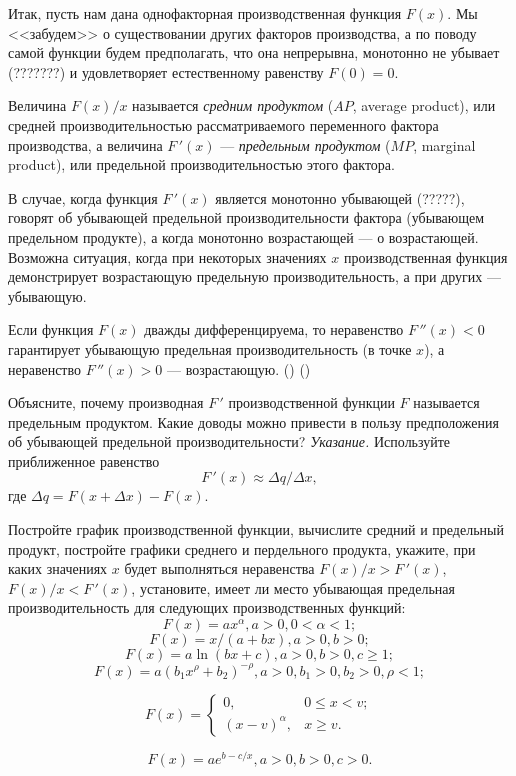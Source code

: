     Итак, пусть нам дана однофакторная производственная функция
    $F(x)$.
    Мы <<забудем>> о существовании других факторов производства, а по
    поводу самой функции будем предполагать, что она непрерывна,
    монотонно не убывает (???????) и удовлетворяет естественному равенству
    $F(0)=0$.

    Величина $F(x)/x$
    называется \emph{средним продуктом}  ($AP$, average product), или
    средней производительностью
    рассматриваемого переменного фактора производства, а  величина
    $F\,'(x)$
    --- \emph{предельным продуктом} ($MP$, marginal product), или
    предельной производительностью этого фактора.

    В случае, когда функция $F\,'(x)$ является монотонно убывающей (?????),
    говорят об убывающей предельной производительности фактора
    (убывающем предельном продукте), а когда монотонно
    возрастающей --- о возрастающей. Возможна ситуация, когда при
    некоторых значениях $x$ производственная функция демонстрирует
    возрастающую предельную производительность, а при других ---
    убывающую.

     Если функция $F(x)$ дважды
    дифференцируема, то неравенство $F\,''(x)<0$ гарантирует убывающую
    предельная производительность (в точке $x$), а неравенство $F\,''(x)>0$
    --- возрастающую.
    () ()

\begin{exer}
    Объясните, почему производная $F\,'$ производственной функции $F$
    называется предельным продуктом. Какие доводы можно привести в пользу
    предположения об убывающей предельной производительности?
    \emph{Указание.} Используйте приближенное равенство
    \[F\,'(x)\approx\Delta q/\Delta x,\]
    где  $\Delta q=F(x+\Delta x)-F(x)$.
\end{exer}

\begin{exer}
    Постройте график производственной функции, вычислите средний и
    предельный продукт, постройте графики среднего и пердельного
    продукта, укажите, при каких значениях $x$ будет выполняться неравенства
    $F(x)/x>F\,'(x)$,
     $F(x)/x<F\,'(x)$, установите, имеет ли место убывающая предельная
     производительность для следующих производственных функций:
    \[F(x)=ax^{\alpha} , a>0, 0<\alpha<1;\]
    \[F(x)=x/(a+bx), a>0, b>0;\]
    \[F(x)=a\ln(bx+c), a>0, b>0, c\geqslant1;\]
    \[F(x)=a(b_{1}x^{\rho}+b_{2})^{-\rho}, a>0, b_{1}>0, b_{2}>0,  \rho<1;\]

    \[F(x)=\left\{
      \begin{array}{ll}
        0, & 0\leqslant x<v; \\
        (x-v)^{\alpha}, & x\geqslant v.
      \end{array}
    \right.\]

    \[F(x)=ae^{b-c/x}, a>0, b>0, c>0.\]
\end{exer}


